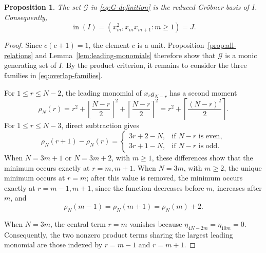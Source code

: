 \documentclass[11pt,reqno]{amsart}
\newtheorem{proposition}[theorem]{Proposition}
\theoremstyle{definition}
\theoremstyle{remark}
\theoremstyle{plain}
\newcommand{\inideal}{\operatorname{in}}
\begin{document}
\begin{proposition}\label{prop:groebner}
The set \(\mathcal G\) in \eqref{eq:G-definition} is the reduced
Gr\"obner basis of \(I\).  Consequently,
$$
 \inideal(I)=(x_m^2,x_mx_{m+1}:m\geq1)=J.
$$
\end{proposition}

\begin{proof}
Since \(c(c+1)=1\), the element \(c\) is a unit.
Proposition~\ref{prop:all-relations} and
Lemma~\ref{lem:leading-monomials} therefore show that
\(\mathcal G\) is a monic generating set of \(I\).
By the product criterion, it remains to consider the three families
in \eqref{eq:overlap-families}.

For \(1\leq r\leq N-2\), the leading monomial of \(x_rg_{N-r}\)
has a second moment
$$
 \rho_N(r)=r^2+
 \left\lfloor\frac{N-r}{2}\right\rfloor^2+
 \left\lceil\frac{N-r}{2}\right\rceil^2
 =r^2+\left\lceil\frac{(N-r)^2}{2}\right\rceil.
$$
For \(1\leq r\leq N-3\), direct subtraction gives
\begin{equation}\label{eq:rho-difference}
 \rho_N(r+1)-\rho_N(r)=
 \begin{cases}
  3r+2-N,&\text{if }N-r\text{ is even},\\
  3r+1-N,&\text{if }N-r\text{ is odd}.
 \end{cases}
\end{equation}
When \(N=3m+1\) or \(N=3m+2\), with \(m\geq1\), these differences
show that the minimum occurs exactly at \(r=m,m+1\).
When \(N=3m\), with \(m\geq2\), the unique minimum occurs at \(r=m\);
after this value is removed, the minimum occurs exactly at
\(r=m-1,m+1\), since the function decreases before \(m\), increases
after \(m\), and
$$
 \rho_N(m-1)=\rho_N(m+1)=\rho_N(m)+2.
$$



When \(N=3m\), the central term \(r=m\) vanishes because
\(\eta_{4N-2m}=\eta_{10m}=0\). Consequently, the two nonzero product
terms sharing the largest leading monomial are those indexed by
\(r=m-1\) and \(r=m+1\).


\end{proof}
\end{document}

